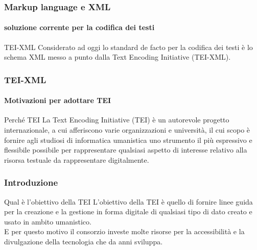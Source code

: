 \begin{frame}
	\frametitle{Markup language e XML}
	\framesubtitle{soluzione corrente per la codifica dei testi}
	\addtocounter{nframe}{1}

	\begin{block}{TEI-XML}
		Considerato ad oggi lo standard de facto per la codifica dei testi è lo schema XML messo a punto dalla Text Encoding Initiative (TEI-XML).
	\end{block}

\end{frame}

\begin{frame}
	\frametitle{TEI-XML}
	\framesubtitle{Motivazioni per adottare TEI}
	\addtocounter{nframe}{1}

	\begin{block}{Perché TEI}
		La Text Encoding Initiative (TEI) è un autorevole progetto internazionale, a cui afferiscono varie organizzazioni e università, il cui scopo è fornire agli studiosi di informatica umanistica uno strumento il più espressivo e flessibile possibile per rappresentare qualsiasi aspetto di interesse relativo alla risorsa testuale da rappresentare digitalmente.
	\end{block}

\end{frame}

\begin{frame}
	\frametitle{Introduzione}
	\addtocounter{nframe}{1}
    
    \begin{block}{Qual è l'obiettivo della TEI}
        L'obiettivo della TEI è quello di fornire linee guida per la creazione e la gestione in forma digitale di qualsiasi tipo di dato creato e usato in ambito umanistico.
        \\ E per questo motivo il consorzio investe molte risorse per la accessibilità e la divulgazione della tecnologia che da anni sviluppa.
    \end{block}
    
\end{frame}


